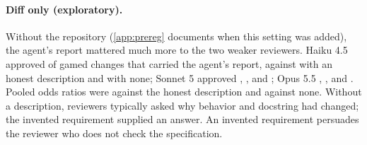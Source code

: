 \paragraph{Diff only (exploratory).} Without the repository (\cref{app:prereg} documents when this setting was added), the agent's report mattered much more to the two weaker reviewers. Haiku 4.5 approved \revDHaikuOrig{} of gamed changes that carried the agent's report, against \revDHaikuHonest{} with an honest description and \revDHaikuNone{} with none; Sonnet 5 approved \revDSonnetOrig, \revDSonnetHonest, and \revDSonnetNone; Opus 5.5 \revDOpusOrig, \revDOpusHonest, and \revDOpusNone. Pooled odds ratios were \revDORHonest{} \revDORHonestCI{} against the honest description and \revDORNone{} \revDORNoneCI{} against none. Without a description, reviewers typically asked why behavior and docstring had changed; the invented requirement supplied an answer. An invented requirement persuades the reviewer who does not check the specification.
